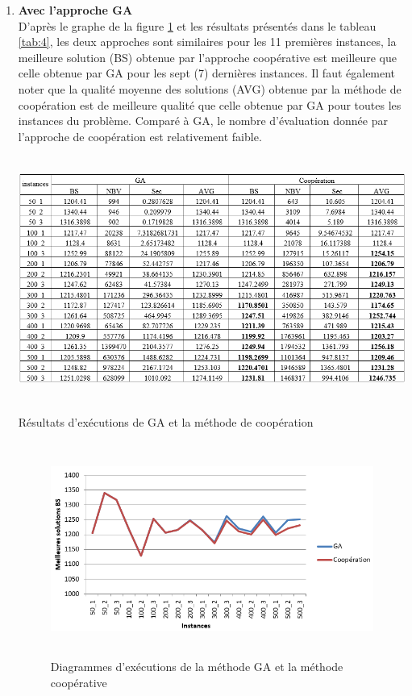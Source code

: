 \begin{enumerate}[label=\alph*)]
	\item \textbf{Avec l’approche GA}\\	
D’après le graphe de la figure \ref{fig:DEMGAMC} et les résultats présentés dans le tableau \ref{tab:4}, les deux approches sont similaires pour les 11 premières instances, la meilleure solution (BS) obtenue par l’approche coopérative  est meilleure que celle obtenue par GA pour les sept  (7) dernières instances. Il faut également noter que la qualité moyenne des solutions (AVG) obtenue par la méthode de coopération est de meilleure qualité que celle obtenue par GA pour toutes les instances du problème. Comparé à GA, le nombre d’évaluation donnée par  l’approche de coopération est relativement faible.

\begin{table}[H]
	\includegraphics[width=15cm,height=8cm]{Chap5/t4.png}
	\caption{Résultats d’exécutions de GA et la méthode de coopération}
	\label{tab:4}
\end{table}

\begin{figure}[H]
	\centering
	\includegraphics[width=16cm,height=7cm]{Chap5/4.png}
	\caption{Diagrammes d’exécutions de la méthode GA et la méthode coopérative}
	\label{fig:DEMGAMC}
\end{figure}


\end{enumerate}


